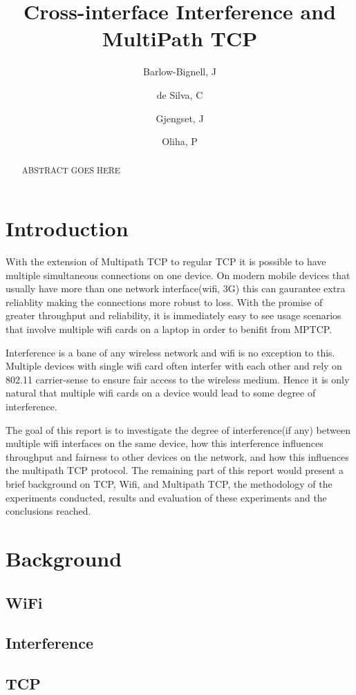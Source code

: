 \documentclass[12pt,a4paper]{article}
\title{Cross-interface Interference and MultiPath TCP}
\author{Barlow-Bignell, J}
\author{de Silva, C}
\author{Gjengset, J}
\author{Oliha, P}
\affil{University College London}
\date{}
\begin{document}
\maketitle

\begin{abstract}
  ABSTRACT GOES HERE
\end{abstract}
\clearpage

\section{Introduction}
With the extension of Multipath TCP to regular TCP it is possible to have
multiple simultaneous connections on one device. On modern mobile devices that
usually have more than one network interface(wifi, 3G) this can gaurantee extra
reliablity making the connections more robust to loss. With the promise of
greater throughput and reliability, it is immediately easy to see usage
scenarios that involve  multiple wifi cards on a laptop in order to benifit from
MPTCP.

Interference is a bane of any wireless network and wifi is no exception to this.
Multiple devices with single wifi card often interfer with each other and rely
on 802.11 carrier-sense to ensure fair access to the wireless medium. Hence it
is only natural that multiple wifi cards on a device would lead to some degree
of interference.

The goal of this report is to investigate the degree of interference(if any)
between multiple wifi interfaces on the same device, how this interference
influences throughput and fairness to other devices on the network, and how this
influences the multipath TCP protocol. The remaining part of this report would
present a brief background on TCP, Wifi, and Multipath TCP, the methodology of
the experiments conducted, results and evaluation of these experiments and the
conclusions reached.

\section{Background}
\subsection{WiFi}
\subsection{Interference}
\subsection{TCP}
\end{document}
